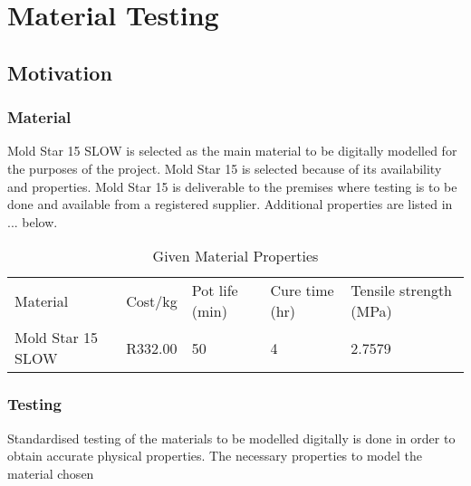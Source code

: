 \chapter{Material Testing}
\label{chp:MT}

\section{Motivation}

\subsection{Material}

Mold Star 15 SLOW is selected as the main material to be digitally modelled for the purposes of the project. Mold Star 15 is selected because of its availability and properties. Mold Star 15 is deliverable to the premises where testing is to be done and available from a registered supplier. Additional properties are listed in ... below.

\begin{table}[]
\caption{Given Material Properties}
\label{tab:mat_prop}
\begin{tabular}{lllll}
Material          & Cost/kg & Pot life (min) & Cure time (hr) & Tensile strength (MPa) \\
Mold Star 15 SLOW & R332.00 & 50             & 4              & 2.7579                
\end{tabular}
\end{table}

\subsection{Testing}

Standardised testing of the materials to be modelled digitally is done in order to obtain accurate physical properties. The necessary properties to model the material chosen 